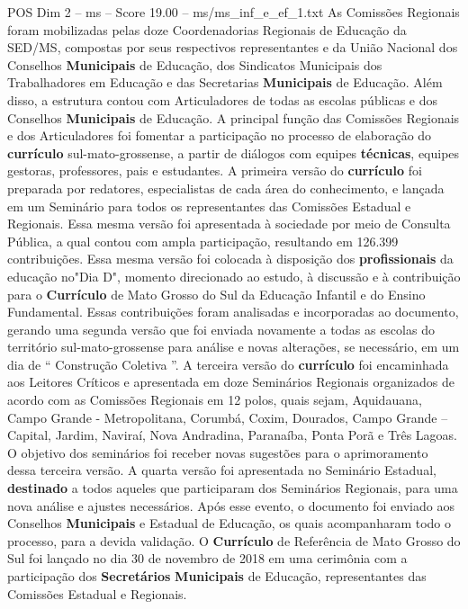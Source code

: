 \begin{textsample}{POS Dim 2 – ms – Score 19.00 – ms/ms\_inf\_e\_ef\_1.txt}
As Comissões Regionais foram mobilizadas pelas doze Coordenadorias Regionais de Educação da SED/MS, compostas por seus respectivos representantes e da União Nacional dos Conselhos \textbf{Municipais} de Educação, dos Sindicatos Municipais dos Trabalhadores em Educação e das Secretarias \textbf{Municipais} de Educação.
Além disso, a estrutura contou com Articuladores de todas as escolas públicas e dos Conselhos \textbf{Municipais} de Educação.
A principal função das Comissões Regionais e dos Articuladores foi fomentar a participação no processo de elaboração do \textbf{currículo} sul-mato-grossense, a partir de diálogos com equipes \textbf{técnicas}, equipes gestoras, professores, pais e estudantes.
A primeira versão do \textbf{currículo} foi preparada por redatores, especialistas de cada área do conhecimento, e lançada em um Seminário para todos os representantes das Comissões Estadual e Regionais.
Essa mesma versão foi apresentada à sociedade por meio de Consulta Pública, a qual contou com ampla participação, resultando em 126.399 contribuições.
Essa mesma versão foi colocada à disposição dos \textbf{profissionais} da educação no"Dia D", momento direcionado ao estudo, à discussão e à contribuição para o \textbf{Currículo} de Mato Grosso do Sul da Educação Infantil e do Ensino Fundamental.
Essas contribuições foram analisadas e incorporadas ao documento, gerando uma segunda versão que foi enviada novamente a todas as escolas do território sul-mato-grossense para análise e novas alterações, se necessário, em um dia de “ Construção Coletiva ”.
A terceira versão do \textbf{currículo} foi encaminhada aos Leitores Críticos e apresentada em doze Seminários Regionais organizados de acordo com as Comissões Regionais em 12 polos, quais sejam, Aquidauana, Campo Grande - Metropolitana, Corumbá, Coxim, Dourados, Campo Grande – Capital, Jardim, Naviraí, Nova Andradina, Paranaíba, Ponta Porã e Três Lagoas.
O objetivo dos seminários foi receber novas sugestões para o aprimoramento dessa terceira versão.
A quarta versão foi apresentada no Seminário Estadual, \textbf{destinado} a todos aqueles que participaram dos Seminários Regionais, para uma nova análise e ajustes necessários.
Após esse evento, o documento foi enviado aos Conselhos \textbf{Municipais} e Estadual de Educação, os quais acompanharam todo o processo, para a devida validação.
O \textbf{Currículo} de Referência de Mato Grosso do Sul foi lançado no dia 30 de novembro de 2018 em uma cerimônia com a participação dos \textbf{Secretários} \textbf{Municipais} de Educação, representantes das Comissões Estadual e Regionais.

\end{textsample}
